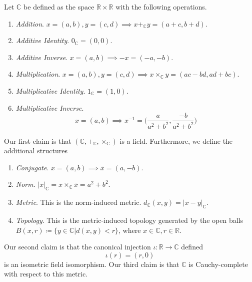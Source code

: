   \begin{theorem}
    \label{thm:construction-of-the-complex-numbers}
    Let $\mathbb{C}$ be defined as the space $\mathbb{R} \times \mathbb{R}$ with the following operations. 
    \begin{enumerate}
      \item \textit{Addition}. $x = (a, b), y = (c, d) \implies x +_{\mathbb{C}} y = (a + c, b + d)$. 
      \item \textit{Additive Identity}. $0_{\mathbb{C}} = (0, 0)$. 
      \item \textit{Additive Inverse}. $x = (a, b) \implies -x = (-a, -b)$. 
      \item \textit{Multiplication}. $x = (a, b), y = (c, d) \implies x \times_{\mathbb{C}} y = (ac - bd, ad + bc)$. 
      \item \textit{Multiplicative Identity}. $1_{\mathbb{C}} = (1, 0)$. 
      \item \textit{Multiplicative Inverse}. 
      \begin{equation}
        x = (a, b) \implies x^{-1} = \bigg( \frac{a}{a^2 + b^2}, \frac{-b}{a^2 + b^2} \bigg)
      \end{equation}
    \end{enumerate}
    Our first claim is that $(\mathbb{C}, +_{\mathbb{C}}, \times_{\mathbb{C}})$ is a field. Furthermore, we define the additional structures
    \begin{enumerate}
      \item \textit{Conjugate}. $x = (a, b) \implies \overline{x} = (a, -b)$. 
      \item \textit{Norm}. $|x|_{\mathbb{C}} = x \times_{\mathbb{C}} \overline{x} = a^2 + b^2$. 
      \item \textit{Metric}. This is the norm-induced metric. $d_{\mathbb{C}}(x, y) = |x - y|_{\mathbb{C}}$. 
      \item \textit{Topology}. This is the metric-induced topology generated by the open balls $B(x, r) \coloneqq \{y \in \mathbb{C} | d(x, y) < r\}$, where $x \in \mathbb{C}, r \in \mathbb{R}$. 
    \end{enumerate} 
    Our second claim is that the canonical injection $\iota: \mathbb{R} \rightarrow \mathbb{C}$ defined 
    \begin{equation}
      \iota(r) = (r, 0)
    \end{equation}
    is an isometric field isomorphism. Our third claim is that $\mathbb{C}$ is Cauchy-complete with respect to this metric. 
  \end{theorem} 

